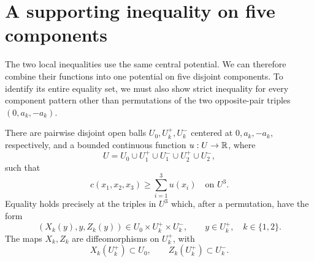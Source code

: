 \section{A supporting inequality on five components}\label{sec:certificate}

The two local inequalities use the same central potential. We can
therefore combine their functions into one potential on five disjoint
components. To identify its entire equality set, we must also show
strict inequality for every component pattern other than permutations
of the two opposite-pair triples \((0,a_k,-a_k)\).

\begin{proposition}\label{prop:certificate}
There are pairwise disjoint open balls \(U_0,U_k^+,U_k^-\) centered
at \(0,a_k,-a_k\), respectively, and a bounded continuous function
\(u:U\to\mathbb R\), where
\[
 U=U_0\cup U_1^+\cup U_1^-\cup U_2^+\cup U_2^-,
\]
such that
\begin{equation}\label{eq:certificate}
 c(x_1,x_2,x_3)\ge\sum_{i=1}^3u(x_i)
 \quad\text{on }U^3.
\end{equation}
Equality holds precisely at the triples in \(U^3\) which, after a
permutation, have the form
\begin{equation}\label{eq:contact}
 (X_k(y),y,Z_k(y))\in U_0\times U_k^+\times U_k^-,
 \qquad y\in U_k^+,\quad k\in\{1,2\}.
\end{equation}
The maps \(X_k,Z_k\) are diffeomorphisms on \(U_k^+\), with
\[
 X_k(U_k^+)\subset U_0,\qquad Z_k(U_k^+)\subset U_k^-.
\]
\end{proposition}

